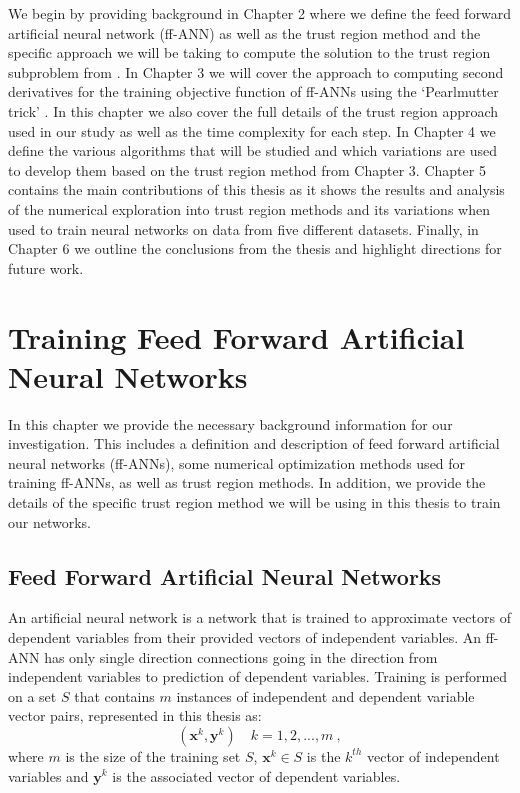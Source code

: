 \documentclass[letterpaper,12pt,titlepage,oneside,final]{book}
\begin{document}
	We begin by providing background in Chapter 2 where we define the feed forward artificial neural network (ff-ANN) as well as the trust region method and the specific approach we will be taking to compute the solution to the trust region subproblem from \cite{adachi.paper}. In Chapter 3 we will cover the approach to computing second derivatives for the training objective function of ff-ANNs using the `Pearlmutter trick' \cite{Pearlmutter.1993}. In this chapter we also cover the full details of the trust region approach used in our study as well as the time complexity for each step. In Chapter 4 we define the various algorithms that will be studied and which variations are used to develop them based on the trust region method from Chapter 3. Chapter 5 contains the main contributions of this thesis as it shows the results and analysis of the numerical exploration into trust region methods and its variations when used to train neural networks on data from five different datasets. Finally, in Chapter 6 we outline the conclusions from the thesis and highlight directions for future work. 
	
	
	\chapter{Training Feed Forward Artificial Neural Networks}
	
	In this chapter we provide the necessary background information for our investigation. This includes a definition and description of feed forward artificial neural networks (ff-ANNs), some numerical optimization methods used for training ff-ANNs, as well as trust region methods. In addition, we provide the details of the specific trust region method we will be using in this thesis to train our networks.
	
	\section{Feed Forward Artificial Neural Networks}
	An artificial neural network is a network that is trained to approximate vectors of dependent variables from their provided vectors of independent variables. An ff-ANN has only single direction connections going in the direction from independent variables to prediction of dependent variables. Training is performed on a set $S$ that contains $m$ instances of independent and dependent variable vector pairs, represented in this thesis as:
	\begin{equation}
	(\mathbf{x}^{k},\mathbf{y}^{k}) \quad  k = 1,2, ..., m \ , 
	\label{equation:training_example}
	\end{equation} 
	where $m$ is the size of the training set $S$, $\mathbf{x}^{k} \in S$ is the $k^{th}$ vector of independent variables and $\mathbf{y}^{k}$ is the associated vector of dependent variables. 
	
\end{document}
